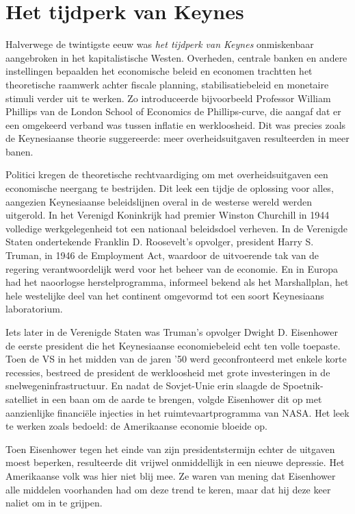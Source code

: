 \documentclass[
  a5paper,
  smalldemyvopaper,11pt,twoside,onecolumn,openright,extrafontsizes,
hidelinks]{memoir}
\begin{document}
\section{Het tijdperk van Keynes}\label{het-tijdperk-van-keynes}

Halverwege de twintigste eeuw was \emph{het tijdperk van Keynes}
onmiskenbaar aangebroken in het kapitalistische Westen. Overheden,
centrale banken en andere instellingen bepaalden het economische beleid
en economen trachtten het theoretische raamwerk achter fiscale planning,
stabilisatiebeleid en monetaire stimuli verder uit te werken. Zo
introduceerde bijvoorbeeld Professor William Phillips van de London
School of Economics de Phillips-curve, die aangaf dat er een omgekeerd
verband was tussen inflatie en werkloosheid. Dit was precies zoals de
Keynesiaanse theorie suggereerde: meer overheidsuitgaven resulteerden in
meer banen.

Politici kregen de theoretische rechtvaardiging om met overheidsuitgaven
een economische neergang te bestrijden. Dit leek een tijdje de oplossing
voor alles, aangezien Keynesiaanse beleidslijnen overal in de westerse
wereld werden uitgerold. In het Verenigd Koninkrijk had premier Winston
Churchill in 1944 volledige werkgelegenheid tot een nationaal
beleidsdoel verheven. In de Verenigde Staten ondertekende Franklin D.
Roosevelt's opvolger, president Harry S. Truman, in 1946 de Employment
Act, waardoor de uitvoerende tak van de regering verantwoordelijk werd
voor het beheer van de economie. En in Europa had het naoorlogse
herstelprogramma, informeel bekend als het Marshallplan, het hele
westelijke deel van het continent omgevormd tot een soort Keynesiaans
laboratorium.

Iets later in de Verenigde Staten was Truman's opvolger Dwight D.
Eisenhower de eerste president die het Keynesiaanse economiebeleid echt
ten volle toepaste. Toen de VS in het midden van de jaren '50 werd
geconfronteerd met enkele korte recessies, bestreed de president de
werkloosheid met grote investeringen in de snelwegeninfrastructuur. En
nadat de Sovjet-Unie erin slaagde de Spoetnik-satelliet in een baan om
de aarde te brengen, volgde Eisenhower dit op met aanzienlijke
financiële injecties in het ruimtevaartprogramma van NASA. Het leek te
werken zoals bedoeld: de Amerikaanse economie bloeide op.

Toen Eisenhower tegen het einde van zijn presidentstermijn echter de
uitgaven moest beperken, resulteerde dit vrijwel onmiddellijk in een
nieuwe depressie. Het Amerikaanse volk was hier niet blij mee. Ze waren
van mening dat Eisenhower alle middelen voorhanden had om deze trend te
keren, maar dat hij deze keer naliet om in te grijpen.
\end{document}
